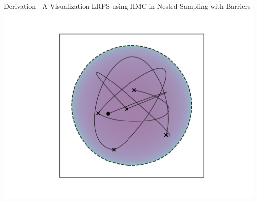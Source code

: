 \documentclass[]{beamer}
\begin{document}
  \begin{frame}{Derivation - A Visualization}
    \centering
    LRPS using HMC in Nested Sampling with Barriers
    \includegraphics[trim={3.2cm, 1cm, 2.85cm, 1cm}, clip, scale=0.6]{figs/barrier_sampling_hmc.png}
  \end{frame}
\end{document}
